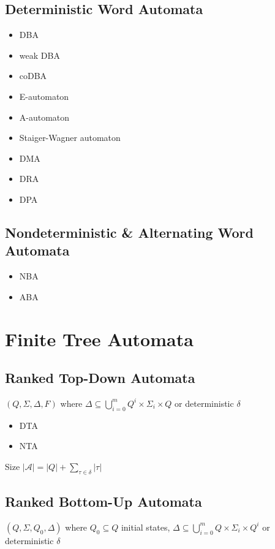\documentclass{article}
\begin{document}
\subsection{Deterministic Word Automata}
\begin{itemize}
	\item DBA
	\item weak DBA
	\item coDBA
	\item E-automaton
	\item A-automaton
	\item Staiger-Wagner automaton
	\item DMA
	\item DRA
	\item DPA
\end{itemize}

\subsection{Nondeterministic \& Alternating Word Automata}
\begin{itemize}
	\item NBA
	\item ABA
\end{itemize}



\newpage
\section{Finite Tree Automata}
\subsection{Ranked Top-Down Automata}
$(Q, \Sigma, \Delta, F)$ where $\Delta \subseteq \bigcup\limits_{i=0}^m Q^i \times \Sigma_i \times Q$ or deterministic $\delta$

\begin{itemize}
	\item DTA
	\item NTA
\end{itemize}

Size $|\mathcal{A}| = |Q| + \sum\limits_{\tau \in \delta} |\tau|$

\subsection{Ranked Bottom-Up Automata}
$(Q, \Sigma, Q_0, \Delta)$ where $Q_0 \subseteq Q$ initial states, $\Delta \subseteq \bigcup\limits_{i=0}^m Q \times \Sigma_i \times Q^i$ or deterministic $\delta$
\end{document}

